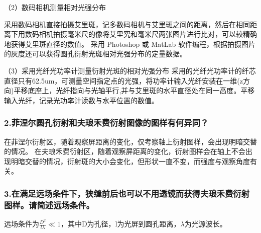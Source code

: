 \documentclass[12pt,a4paper,UTF8]{ctexart}
\begin{document}
（2）数码相机测量相对光强分布

采用数码相机直接拍摄艾里斑，记多数码相机与艾里斑之间的距离，然后在相同距离下用数码相机拍摄毫米尺的像将艾里究和毫米尺两张图片进行比对，可以较精确地获得艾里斑直径的数值。
采用 Photoshop 或 MatLab 软件编程，根据拍摄图片的灰度还可以获得圆孔衍射光斑相对光强分布的定量数据。

（3）采用光纤光功率计测量衍射光斑的相对光强分布
采用的光纤光功率计的纤芯直径只有62.5um，可测量空间指定点的光强，将功率计输入光纤安装在一维(z方向)平移底座上，光纤指向与光轴平行,并与艾里斑的水平直径处在同一高度。平移输入光纤，记录光功率计读数与水平位置的数值。

\subsubsection*{2.菲涅尔圆孔衍射和夫琅禾费衍射图像的图样有何异同？}
在菲涅尔衍射区，随着观察屏距离的变化，仅考察轴上衍射图样，会出现明暗交替的情况。
在夫琅禾费衍射区，随着观察屏距离的变化，衍射图样会在轴上不会出现明暗交替的情况，衍射斑的大小会变化，但形状一直不变，而强度与观察角度有关。

\subsubsection*{3.在满足远场条件下，狭缝前后也可以不用透镜而获得夫琅禾费衍射图样。请简述远场条件。}
远场条件为$\frac{D^2}{l\lambda}\ll 1$，其中D为孔径，l为光屏到圆孔距离，$\lambda$为光源波长。
\end{document}
